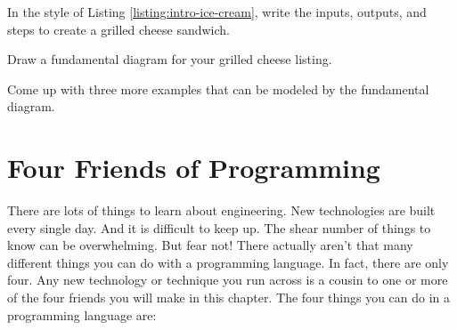\begin{question}
  In the style of Listing \ref{listing:intro-ice-cream}, write the inputs, outputs, and steps to create a grilled cheese sandwich.
\end{question}

\begin{question}
  Draw a fundamental diagram for your grilled cheese listing.
\end{question}

\begin{question}
  Come up with three more examples that can be modeled by the fundamental diagram.
\end{question}

\section{Four Friends of Programming}

There are lots of things to learn about engineering. New technologies are built every single day. And it is difficult to keep up. The shear number of things to know can be overwhelming. But fear not! There actually aren't that many different things you can do with a programming language. In fact, there are only four. Any new technology or technique you run across is a cousin to one or more of the four friends you will make in this chapter. The four things you can do in a programming language are:

